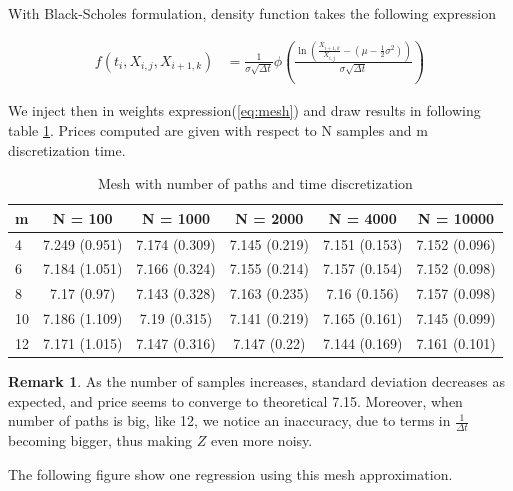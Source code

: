 \documentclass[english,11pt,openany]{report}
\theoremstyle{definition}
\theoremstyle{plain}
\theoremstyle{definition}
\newtheorem{Rem}[Th]{Remark}
\begin{document}
With Black-Scholes formulation, density function takes the following expression 

\begin{align}
f(t_i, X_{i, j}, X_{i+1, k}) & = \frac{1}{\sigma \sqrt{\Delta t}} \phi\left(\frac{\ln(\frac{X_{i+1, k}}{X_{i, j}} - (\mu - \frac{1}{2} \sigma ^2))}{\sigma \sqrt{\Delta t}} \right)
\end{align}


We inject then in weights expression(\ref{eq:mesh}) and draw results in following table \ref{table:mesh}. Prices computed are given with respect to N samples and m discretization time.

\begin{table}[H]
	\centering
	\caption{Mesh with number of paths and time discretization}
	\label{table:mesh}
	\begin{tabular}{|l|c|c|c|c|c|}
		\hline
		m & N = 100           & N = 1000    &N = 2000&   N = 4000         & N = 10000 \\ 
		\hline
		4 & 7.249 (0.951) & 7.174 (0.309) & 7.145 (0.219) & 7.151 (0.153) & 7.152 (0.096) \\ \hline
		6 &  7.184 (1.051) & 7.166 (0.324) & 7.155 (0.214) & 7.157 (0.154) & 7.152 (0.098) \\ \hline
		8 & 7.17 (0.97)   & 7.143 (0.328) & 7.163 (0.235) & 7.16 (0.156)  & 7.157 (0.098) \\ \hline
		10  &7.186 (1.109) & 7.19 (0.315)  & 7.141 (0.219) & 7.165 (0.161) & 7.145 (0.099) \\ \hline
		12 & 7.171 (1.015) & 7.147 (0.316) & 7.147 (0.22)  & 7.144 (0.169) & 7.161 (0.101) \\ \hline
		\hline
	\end{tabular}
\end{table}

\begin{Rem}
	As the number of samples increases, standard deviation decreases as expected, and price seems to converge to theoretical 7.15. 
	Moreover, when number of paths is big, like 12, we notice an inaccuracy, due to terms in $\frac{1}{\Delta t}$ becoming bigger, thus making $Z$ even more noisy. 
\end{Rem}

 
 The following figure show one regression using this mesh approximation.
 
\end{document}
